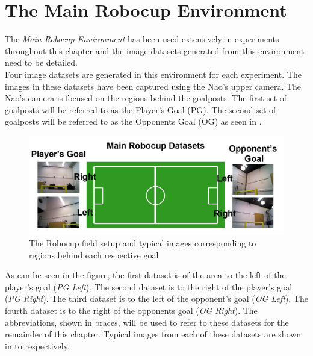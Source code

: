 \section{The Main Robocup Environment}
\label{sec:datasets}
The \textit{Main Robocup Environment} has been used extensively in experiments throughout this chapter and the image datasets generated from this environment need to be detailed.\\

Four image datasets are generated in this environment for each experiment. The images in these datasets have been captured using the Nao's upper camera. The Nao's camera is focused on the regions behind the goalposts. The first set of goalposts will be referred to as the Player's Goal (PG). The second set of goalposts will be referred to as the Opponents Goal (OG) as seen in . \\


\begin{figure}%
  \centering
    \includegraphics[width=1.0\textwidth]{../Drawings/RobocupDataset/DatasetSetup.jpg}
    \caption{The Robocup field setup and typical images corresponding to regions behind each respective goal} 
    \label{fig:datasetSetup}
 \end{figure}


As can be seen in the figure, the first dataset is of the area to the left of the player's goal (\textit{PG Left}). The second dataset is to the right of the player's goal (\textit{PG Right}). The third dataset is to the left of the opponent's goal (\textit{OG Left}). The fourth dataset is to the right of the opponents goal (\textit{OG Right}). The abbreviations, shown in braces, will be used to refer to these datasets for the remainder of this chapter. Typical images from each of these datasets are shown in  to  respectively.\\

